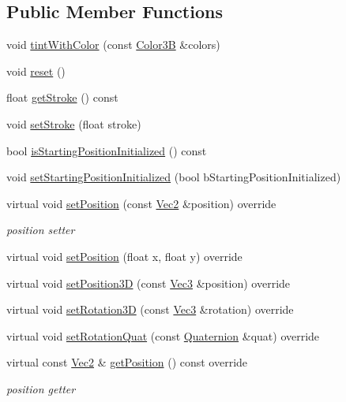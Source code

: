 \subsection*{Public Member Functions}
\begin{DoxyCompactItemize}
\item 
void \hyperlink{classMotionStreak3D_a5c79a196ddadb3a869da49e3d501bb24}{tint\+With\+Color} (const \hyperlink{structColor3B}{Color3B} \&colors)
\item 
void \hyperlink{classMotionStreak3D_af626dc0c3699973f3d051a4771bbf8a5}{reset} ()
\item 
float \hyperlink{classMotionStreak3D_a6bb96d9a0dceaa6d4fa56b6c93c0a9b0}{get\+Stroke} () const
\item 
void \hyperlink{classMotionStreak3D_a7e5feedbf87874e24710d564d16d4649}{set\+Stroke} (float stroke)
\item 
bool \hyperlink{classMotionStreak3D_a886e755c13fabbeab8f326b512289ade}{is\+Starting\+Position\+Initialized} () const
\item 
void \hyperlink{classMotionStreak3D_a62b248c1dd60a576a0a471da62e3b5de}{set\+Starting\+Position\+Initialized} (bool b\+Starting\+Position\+Initialized)
\item 
virtual void \hyperlink{classMotionStreak3D_a8e4698c3850e094f90600e3ba4604651}{set\+Position} (const \hyperlink{classVec2}{Vec2} \&position) override
\begin{DoxyCompactList}\small\item\em position setter \end{DoxyCompactList}\item 
virtual void \hyperlink{classMotionStreak3D_ada67cecb8a81f0f48615d24eb9fc2373}{set\+Position} (float x, float y) override
\item 
virtual void \hyperlink{classMotionStreak3D_a0a0d2f5f302ecaecb2e6652e5863f28f}{set\+Position3D} (const \hyperlink{classVec3}{Vec3} \&position) override
\item 
virtual void \hyperlink{classMotionStreak3D_abe4bc651d6ce068c366edc18cb0aaead}{set\+Rotation3D} (const \hyperlink{classVec3}{Vec3} \&rotation) override
\item 
virtual void \hyperlink{classMotionStreak3D_ab3b762bdfe6cbda5cda6b69ca8d31845}{set\+Rotation\+Quat} (const \hyperlink{classQuaternion}{Quaternion} \&quat) override
\item 
virtual const \hyperlink{classVec2}{Vec2} \& \hyperlink{classMotionStreak3D_a5c9d70a707ecdaf49d8793ae6e4bce7e}{get\+Position} () const override
\begin{DoxyCompactList}\small\item\em position getter \end{DoxyCompactList}\item 

\end{DoxyCompactItemize}
